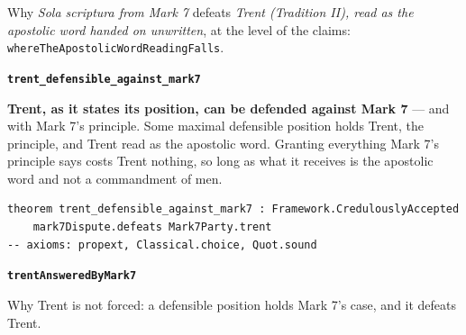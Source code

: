\documentclass[11pt]{article}
\begin{document}
\noindent Why \emph{Sola scriptura from Mark 7} defeats \emph{Trent (Tradition II), read as the apostolic word handed on unwritten}, at the level of the claims: \texttt{where\allowbreak{}The\allowbreak{}Apostolic\allowbreak{}Word\allowbreak{}Reading\allowbreak{}Falls}.
\par\medskip\noindent\textbf{\texttt{trent\_\allowbreak{}defensible\_\allowbreak{}against\_\allowbreak{}mark7}}\par\nobreak\noindent
\textbf{Trent, as it states its position, can be defended against Mark 7} — and with Mark 7’s principle. Some maximal defensible position holds Trent, the principle, and Trent read as the apostolic word. Granting everything Mark 7’s principle says costs Trent nothing, so long as what it receives is the apostolic word and not a commandment of men.

{\small\begin{verbatim}
theorem trent_defensible_against_mark7 : Framework.CredulouslyAccepted
    mark7Dispute.defeats Mark7Party.trent
-- axioms: propext, Classical.choice, Quot.sound
\end{verbatim}}
\par\medskip\noindent\textbf{\texttt{trent\allowbreak{}Answered\allowbreak{}By\allowbreak{}Mark7}}\par\nobreak\noindent
Why Trent is not forced: a defensible position holds Mark 7’s case, and it defeats Trent.
\end{document}

